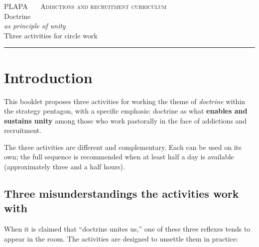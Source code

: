 \documentclass[11pt, a4paper]{article}
\begin{document}

\thispagestyle{plain}
\begin{center}
  \vspace*{1.5em}
  {\color{tenue}\scshape\small PLAPA \ \textbullet\ \ Addictions and recruitment curriculum}\\
  \vspace{2em}
  {\color{doctrinaAzul}\Huge Doctrine}\\[0.35em]
  {\color{tinte}\LARGE\itshape as principle of unity}\\
  \vspace{1.4em}
  {\color{tenue}\large Three activities for circle work}\\
  \vspace{0.6em}
  {\color{regla}\rule{0.35\linewidth}{0.5pt}}
\end{center}

\vspace{2em}

\section*{Introduction}

This booklet proposes three activities for working the theme of \emph{doctrine} within the strategy pentagon, with a specific emphasis: doctrine as what \textbf{enables and sustains unity} among those who work pastorally in the face of addictions and recruitment.

The three activities are different and complementary. Each can be used on its own; the full sequence is recommended when at least half a day is available (approximately three and a half hours).

\subsection*{Three misunderstandings the activities work with}

When it is claimed that ``doctrine unites us,'' one of these three reflexes tends to appear in the room. The activities are designed to unsettle them in practice:
\end{document}
